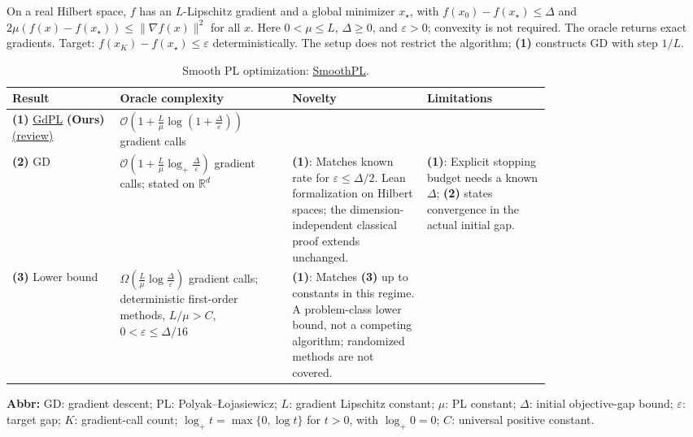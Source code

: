 \begin{table}[tp]
\centering
\caption{Smooth PL optimization: \href{https://github.com/k3nfalt/longtails/blob/main/LongTails/Setups/SmoothPL.lean}{SmoothPL}.}\label{tab:SmoothPL}
\parbox{\linewidth}{\footnotesize On a real Hilbert space, $f$ has an $L$-Lipschitz gradient and a global minimizer $x_\star$, with $f(x_0)-f(x_\star)\le\Delta$ and $2\mu(f(x)-f(x_\star))\le\|\nabla f(x)\|^2$ for all $x$. Here $0<\mu\le L$, $\Delta\ge0$, and $\varepsilon>0$; convexity is not required. The oracle returns exact gradients. Target: $f(x_K)-f(x_\star)\le\varepsilon$ deterministically. The setup does not restrict the algorithm; \textbf{(1)} constructs GD with step $1/L$.}\par\smallskip
\begin{threeparttable}
\footnotesize
\setlength{\tabcolsep}{4pt}\renewcommand{\arraystretch}{1.25}
\begin{tabularx}{\linewidth}{@{}>{\raggedright\arraybackslash}p{0.20\linewidth}>{\raggedright\arraybackslash}p{0.32\linewidth}>{\raggedright\arraybackslash}p{0.25\linewidth}>{\raggedright\arraybackslash}X@{}}
\toprule
\textbf{Result} & \textbf{Oracle complexity} & \textbf{Novelty} & \textbf{Limitations} \\
\midrule
\textbf{(1)} \href{https://github.com/k3nfalt/longtails/blob/main/LongTails/Theorems/GdPL.lean}{Gd\allowbreak PL} \textbf{(Ours)} \href{https://github.com/k3nfalt/longtails/blob/main/scripts/reviews/GdPL.md}{(review)}
& $\mathcal{O}\!\left(1+\frac{L}{\mu}\log\left(1+\frac{\Delta}{\varepsilon}\right)\right)$ gradient calls
& & \\
\midrule[1.2pt]
\textbf{(2)} GD \citep[Theorem~1, arXiv v4]{smoothPLKarimi2016v4}
& $\mathcal{O}\!\left(1+\frac{L}{\mu}\log_+\frac{\Delta}{\varepsilon}\right)$ gradient calls; stated on $\mathbb{R}^d$
& \textbf{(1)}: Matches known rate for $\varepsilon\le\Delta/2$. Lean formalization on Hilbert spaces; the dimension-independent classical proof extends unchanged.
& \textbf{(1)}: Explicit stopping budget needs a known $\Delta$; \textbf{(2)} states convergence in the actual initial gap. \\
\midrule
\textbf{(3)} Lower bound \citep[Theorems~2--3, arXiv v2]{smoothPLYue2023v2}
& $\Omega\!\left(\frac{L}{\mu}\log\frac{\Delta}{\varepsilon}\right)$ gradient calls; deterministic first-order methods, $L/\mu>C$, $0<\varepsilon\le\Delta/16$
& \textbf{(1)}: Matches \textbf{(3)} up to constants in this regime. A problem-class lower bound, not a competing algorithm; randomized methods are not covered.
& \\
\bottomrule
\end{tabularx}
\begin{tablenotes}[flushleft]\footnotesize
\item[] \textbf{Abbr:} GD: gradient descent; PL: Polyak--\L{}ojasiewicz; $L$: gradient Lipschitz constant; $\mu$: PL constant; $\Delta$: initial objective-gap bound; $\varepsilon$: target gap; $K$: gradient-call count; $\log_+t=\max\{0,\log t\}$ for $t>0$, with $\log_+0=0$; $C$: universal positive constant.
\end{tablenotes}
\end{threeparttable}
\end{table}
\clearpage
